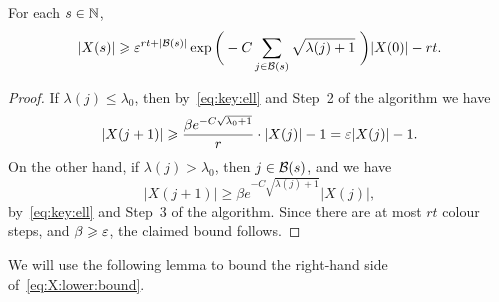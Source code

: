 \begin{lemma}
  \label{lem:X:lower:bound} %
  For each \(s \in \mathbb{N}\), 
  \begin{equation}\label{eq:X:lower:bound}
    |X(s)| \geqslant \varepsilon^{rt + |\mathcal{B}(s)|} \exp\bigg( - C \sum_{j \in \mathcal{B}(s)} \sqrt{\lambda(j)+1}\,\, \bigg) |X(0)| - rt.
  \end{equation}
\end{lemma}
%
\begin{proof}
  If \(\lambda(j) \le \lambda_0\), then by~\eqref{eq:key:ell} and Step~2 of the algorithm we have
  \begin{equation*}
    |X(j+1)| \geqslant \frac{\beta e^{- C \sqrt{\lambda_0 + 1}}}{r} \cdot |X(j)| - 1 = \varepsilon |X(j)| - 1.
  \end{equation*}
  On the other hand, if \(\lambda(j) > \lambda_0\), then \(j \in \mathcal{B}(s)\), and we have 
  \begin{equation*}
    |X(j+1)| \ge \beta e^{- C \sqrt{\lambda(j) + 1}} |X(j)|,
  \end{equation*}
  by~\eqref{eq:key:ell} and Step~3 of the algorithm. Since there are at most \(rt\) colour steps, and \(\beta \geqslant \varepsilon\), the claimed bound follows.
\end{proof}

We will use the following lemma to bound the right-hand side of~\eqref{eq:X:lower:bound}.

